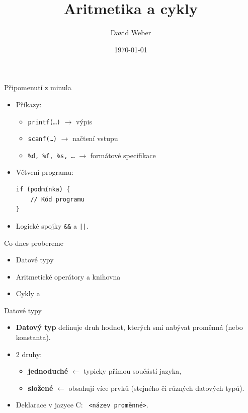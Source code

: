\documentclass[14pt,aspectratio=169]{beamer}
\title{Aritmetika a cykly}
\author{David Weber}
\date{\today}
\begin{document}

    \begin{frame}
        \titlepage
    \end{frame}

    \begin{frame}[t,fragile]{Připomenutí z minula}
        \begin{itemize}
            \item Příkazy:
            \begin{itemize}
                \item \texttt{printf(\dots)} $\rightarrow$ výpis
                \item \texttt{scanf(\dots)} $\rightarrow$ načtení vstupu
                \item \texttt{\%d, \%f, \%s, \dots} $\rightarrow$ formátové specifikace
            \end{itemize}
            \item Větvení programu:
            \begin{lstlisting}
if (podmínka) {
    // Kód programu
}
            \end{lstlisting}
            \item Logické spojky \texttt{\&\&} a \texttt{||}.
        \end{itemize}
    \end{frame}

    \begin{frame}[t]{Co dnes probereme}
        \begin{itemize}
            \item Datové typy
            \item Aritmetické operátory a knihovna 
            \item Cykly  a 
        \end{itemize}
    \end{frame}

    \begin{frame}[t]{Datové typy}
        \begin{itemize}
            \item \textbf{Datový typ} definuje druh hodnot, kterých smí nabývat proměnná (nebo konstanta).
            \item 2 druhy:
            \begin{itemize}
                \item \textbf{jednoduché} $\leftarrow$ typicky přímou součástí jazyka,
                \item \textbf{složené} $\leftarrow$ obsahují více prvků (stejného či různých datových typů).
            \end{itemize}
            \item Deklarace v jazyce C: \texttt{ <název proměnné>}.
        \end{itemize}
    \end{frame}
\end{document}
